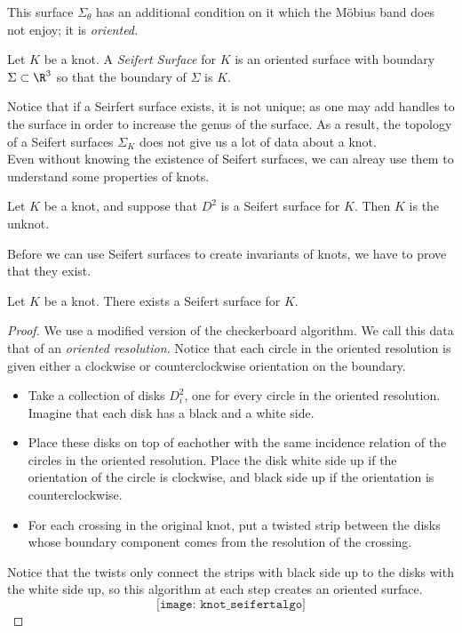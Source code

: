 This surface $\Sigma_\theta$ has an additional condition on it which the M\"obius band does not enjoy; it is \emph{oriented.}

\begin{definition}
Let $K$ be a knot. A \emph{Seifert Surface} for $K$ is an oriented surface with boundary $\Sigma\subset \R^3$ so that the boundary of $\Sigma$ is $K$. 
\end{definition}
Notice that if a Seirfert surface exists, it is not unique; as one may add handles to the surface in order to increase the genus of the surface. As a result, the topology of a Seifert surfaces $\Sigma_K$ does not give us a lot of data about a knot. \\
Even without knowing the existence of Seifert surfaces, we can alreay use them to understand some properties of knots. 
\begin{claim}
Let $K$ be a knot, and suppose that $D^2$ is a Seifert surface for $K$. Then $K$ is the unknot.
\end{claim}
Before we can use Seifert surfaces to create invariants of knots, we have to prove that they exist. 
\begin{theorem}
Let $K$ be a knot. There exists a Seifert surface for $K$. 
\end{theorem}
\begin{proof}
We use a modified version of the checkerboard algorithm.
 We call this data that of an \emph{oriented resolution.} Notice that each circle in the oriented resolution is given either a clockwise or counterclockwise orientation on the boundary. \\
\begin{itemize}
\item Take a collection of disks $D^2_i$, one for every circle in the oriented resolution. Imagine that each disk has a black and a white side.
\item Place these disks on top of eachother with the same incidence relation of the circles in the oriented resolution. Place the disk white side up if the orientation of the circle is clockwise, and black side up if the orientation is counterclockwise.
\item  For each crossing  in the original knot, put a twisted strip between the disks whose boundary component comes from the resolution of the crossing.
\end{itemize}
Notice that the twists only connect the strips with black side up to the disks with the white side up, so this algorithm at each step creates an oriented surface. 
\[\texttt{[image: knot\_seifertalgo]}\]
\end{proof}
